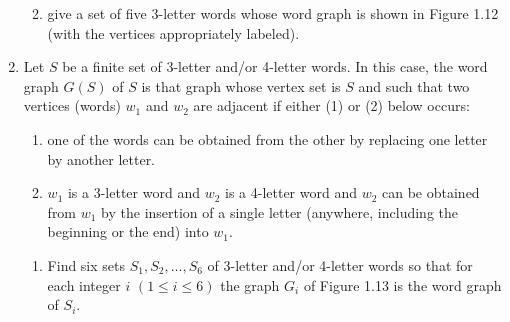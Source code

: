 \documentclass[letterpaper,12pt,fleqn]{article}
\begin{document}
\begin{enumerate}
\begin{enumerate}
    \bigskip

    \begin{center}
    \end{center}

    \bigskip

  \item give a set of five 3-letter words whose word graph is shown in Figure 1.12 (with the vertices appropriately
    labeled).

    \bigskip

    \begin{center}
    \end{center}
  \end{enumerate}

  \bigskip

\item Let \(S\) be a finite set of 3-letter and/or 4-letter words.  In this case, the word graph \(G(S)\) of \(S\)
  is that graph whose vertex set is \(S\) and such that two vertices (words) \(w_1\) and \(w_2\) are adjacent if
  either (1) or (2) below occurs:
  \begin{enumerate}[label=(\arabic*)]
  \item one of the words can be obtained from the other by replacing one letter by another letter.
  \item \(w_1\) is a 3-letter word and \(w_2\) is a 4-letter word and \(w_2\) can be obtained from \(w_1\) by the
    insertion of a single letter (anywhere, including the beginning or the end) into \(w_1\).
  \end{enumerate}
  \begin{enumerate}
  \item Find six sets \(S_1,S_2,\ldots,S_6\) of 3-letter and/or 4-letter words so that for each integer \(i\)
    \((1\le i\le6)\) the graph \(G_i\) of Figure 1.13 is the word graph of \(S_i\).
    \begin{center}


\end{center}
\end{enumerate}
\end{enumerate}
\end{document}
